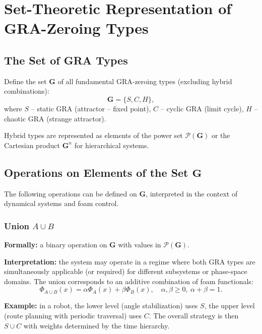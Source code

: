 \documentclass[12pt,a4paper]{article}
\newcommand{\G}{\mathbf{G}}
\newcommand{\Pset}{\mathcal{P}}
\begin{document}
\newpage

\section{Set-Theoretic Representation of GRA-Zeroing Types}
\label{sec:set}

\subsection{The Set of GRA Types}

Define the set $\G$ of all fundamental GRA-zeroing types (excluding hybrid combinations):
\begin{equation}
    \G = \{ S, C, H \},
\end{equation}
where $S$ – static GRA (attractor – fixed point), $C$ – cyclic GRA (limit cycle), $H$ – chaotic GRA (strange attractor).

Hybrid types are represented as elements of the power set $\Pset(\G)$ or the Cartesian product $\G^n$ for hierarchical systems.

\subsection{Operations on Elements of the Set $\G$}

The following operations can be defined on $\G$, interpreted in the context of dynamical systems and foam control.

\subsubsection{Union $A \cup B$}

\textbf{Formally:} a binary operation on $\G$ with values in $\Pset(\G)$.

\textbf{Interpretation:} the system may operate in a regime where both GRA types are simultaneously applicable (or required) for different subsystems or phase-space domains. The union corresponds to an additive combination of foam functionals:
\begin{equation}
    \Phi_{A \cup B}(x) = \alpha \Phi_A(x) + \beta \Phi_B(x), \quad \alpha,\beta \geq 0,\ \alpha+\beta=1.
\end{equation}

\textbf{Example:} in a robot, the lower level (angle stabilization) uses $S$, the upper level (route planning with periodic traversal) uses $C$. The overall strategy is then $S \cup C$ with weights determined by the time hierarchy.
\end{document}
